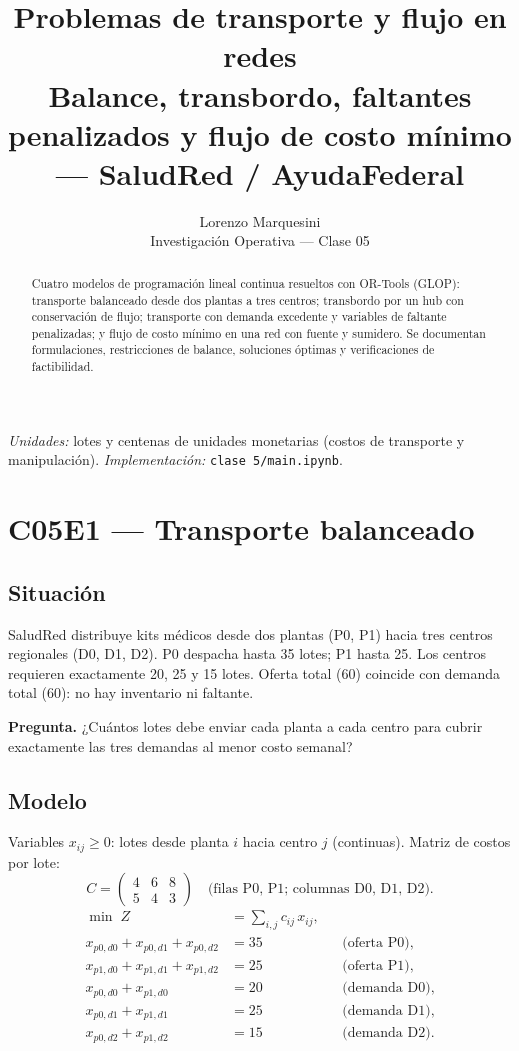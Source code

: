 \documentclass[11pt,a4paper]{article}
\title{\bfseries Problemas de transporte y flujo en redes\\
\large Balance, transbordo, faltantes penalizados y flujo de costo mínimo --- SaludRed / AyudaFederal}
\author{Lorenzo Marquesini\\[0.25em]
\small Investigación Operativa --- Clase 05}
\date{}
\newcommand{\pregunta}[1]{\noindent\textbf{Pregunta.} #1\par}
\begin{document}
\vspace{-0.6em}
\maketitle
\vspace{-1.4em}

\begin{abstract}
\noindent
Cuatro modelos de programación lineal continua resueltos con OR-Tools (GLOP): transporte balanceado desde dos plantas a tres centros; transbordo por un hub con conservación de flujo; transporte con demanda excedente y variables de faltante penalizadas; y flujo de costo mínimo en una red con fuente y sumidero. Se documentan formulaciones, restricciones de balance, soluciones óptimas y verificaciones de factibilidad.
\end{abstract}

\noindent\textit{Unidades:} lotes y centenas de unidades monetarias (costos de transporte y manipulación). \textit{Implementación:} \texttt{clase 5/main.ipynb}.

\section{C05E1 --- Transporte balanceado}

\subsection*{Situación}
SaludRed distribuye kits médicos desde dos plantas (P0, P1) hacia tres centros regionales (D0, D1, D2). P0 despacha hasta 35 lotes; P1 hasta 25. Los centros requieren exactamente 20, 25 y 15 lotes. Oferta total (60) coincide con demanda total (60): no hay inventario ni faltante.

\pregunta{¿Cuántos lotes debe enviar cada planta a cada centro para cubrir exactamente las tres demandas al menor costo semanal?}

\subsection*{Modelo}
Variables $x_{ij}\ge 0$: lotes desde planta $i$ hacia centro $j$ (continuas). Matriz de costos por lote:
\[
C = \begin{pmatrix}
4 & 6 & 8 \\
5 & 4 & 3
\end{pmatrix}
\quad\text{(filas P0, P1; columnas D0, D1, D2).}
\]
\begin{align}
\min \; Z &= \sum_{i,j} c_{ij}\, x_{ij},\\
x_{p0,d0} + x_{p0,d1} + x_{p0,d2} &= 35 && \text{(oferta P0)},\\
x_{p1,d0} + x_{p1,d1} + x_{p1,d2} &= 25 && \text{(oferta P1)},\\
x_{p0,d0} + x_{p1,d0} &= 20 && \text{(demanda D0)},\\
x_{p0,d1} + x_{p1,d1} &= 25 && \text{(demanda D1)},\\
x_{p0,d2} + x_{p1,d2} &= 15 && \text{(demanda D2)}.
\end{align}
\end{document}
